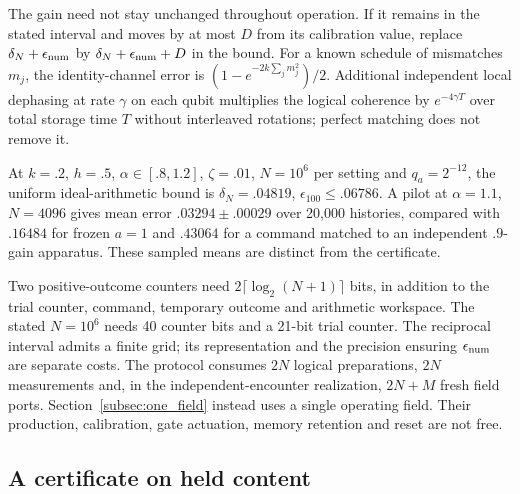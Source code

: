 \documentclass[11pt]{article}
\theoremstyle{definition}
\theoremstyle{remark}
\begin{document}
The gain need not stay unchanged throughout operation. If it remains
in the stated interval and moves by at most $D$ from its calibration
value, replace $\delta_N+\epsilon_{\rm num}$ by
$\delta_N+\epsilon_{\rm num}+D$ in the bound. For a known schedule
of mismatches $m_j$, the identity-channel error is
$(1-e^{-2k\sum_jm_j^2})/2$. Additional independent local dephasing
at rate $\gamma$ on each qubit multiplies the logical coherence by
$e^{-4\gamma T}$ over total storage time $T$ without interleaved
rotations; perfect matching does not remove it.

At $k=.2$, $h=.5$, $\alpha\in[.8,1.2]$, $\zeta=.01$, $N=10^6$ per setting and $q_a=2^{-12}$, the uniform ideal-arithmetic bound is $\delta_N=.04819$, $\epsilon_{100}\le.06786$. A pilot at $\alpha=1.1$, $N=4096$ gives mean error $.03294\pm.00029$ over 20,000 histories, compared with $.16484$ for frozen $a=1$ and $.43064$ for a command matched to an independent $.9$-gain apparatus. These sampled means are distinct from the certificate.

Two positive-outcome counters need
$2\lceil\log_2(N+1)\rceil$ bits, in addition to the trial counter,
command, temporary outcome and arithmetic workspace. The stated
$N=10^6$ needs 40 counter bits and a 21-bit trial counter.
The reciprocal interval admits a finite grid; its representation and
the precision ensuring $\epsilon_{\rm num}$ are separate costs.
The protocol consumes $2N$ logical preparations, $2N$ measurements
and, in the independent-encounter realization, $2N+M$ fresh field ports.
Section~\ref{subsec:one_field} instead uses a single operating field.
Their production, calibration, gate
actuation, memory retention and reset are not free.

\subsection{A certificate on held content}
\end{document}
